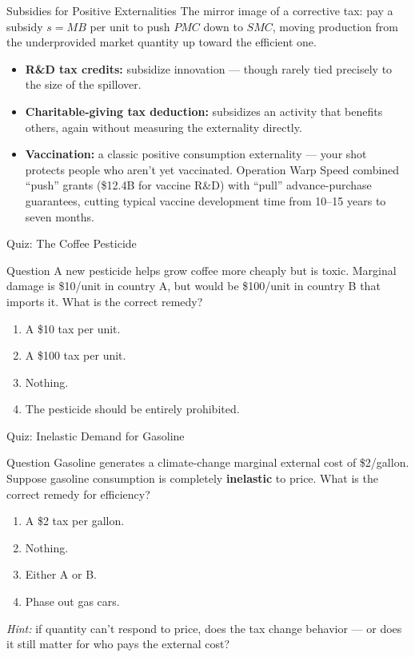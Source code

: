 \documentclass[11pt,aspectratio=169]{beamer}
\begin{document}
\begin{frame}{Subsidies for Positive Externalities}
  The mirror image of a corrective tax: pay a subsidy \(s = MB\) per unit to push \(PMC\) down to \(SMC\), moving production from the underprovided market quantity up toward the efficient one.
  \begin{itemize}
    \item \textbf{R\&D tax credits:} subsidize innovation --- though rarely tied precisely to the size of the spillover.
    \item \textbf{Charitable-giving tax deduction:} subsidizes an activity that benefits others, again without measuring the externality directly.
    \item \textbf{Vaccination:} a classic positive consumption externality --- your shot protects people who aren't yet vaccinated. Operation Warp Speed combined ``push'' grants (\$12.4B for vaccine R\&D) with ``pull'' advance-purchase guarantees, cutting typical vaccine development time from 10--15 years to seven months.
  \end{itemize}
\end{frame}

\begin{frame}{Quiz: The Coffee Pesticide}
  \begin{block}{Question}
    A new pesticide helps grow coffee more cheaply but is toxic. Marginal damage is \$10/unit in country A, but would be \$100/unit in country B that imports it. What is the correct remedy?
  \end{block}
  \begin{enumerate}
    \item[A.] A \$10 tax per unit.
    \item[B.] A \$100 tax per unit.
    \item[C.] Nothing.
    \item[D.] The pesticide should be entirely prohibited.
  \end{enumerate}
 
  
\end{frame}

\begin{frame}{Quiz: Inelastic Demand for Gasoline}
  \begin{block}{Question}
    Gasoline generates a climate-change marginal external cost of \$2/gallon. Suppose gasoline consumption is completely \textbf{inelastic} to price. What is the correct remedy for efficiency?
  \end{block}
  \begin{enumerate}
    \item[A.] A \$2 tax per gallon.
    \item[B.] Nothing.
    \item[C.] Either A or B.
    \item[D.] Phase out gas cars.
  \end{enumerate}
  \vspace{0.4em}
  \small \emph{Hint:} if quantity can't respond to price, does the tax change behavior --- or does it still matter for who pays the external cost?
\end{frame}
\end{document}

